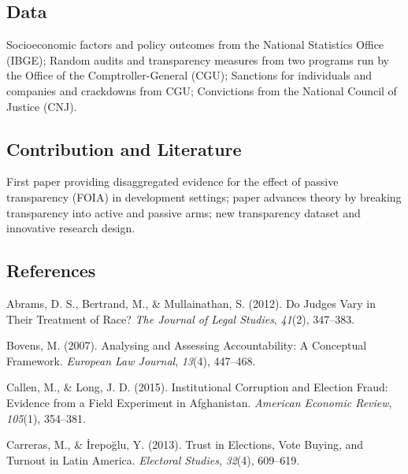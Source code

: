\documentclass[]{article}
\begin{document}
\hypertarget{data-2}{%
\subsection{Data}\label{data-2}}

Socioeconomic factors and policy outcomes from the National Statistics
Office (IBGE); Random audits and transparency measures from two programs
run by the Office of the Comptroller-General (CGU); Sanctions for
individuals and companies and crackdowns from CGU; Convictions from the
National Council of Justice (CNJ).

\hypertarget{contribution-and-literature}{%
\subsection{Contribution and
Literature}\label{contribution-and-literature}}

First paper providing disaggregated evidence for the effect of passive
transparency (FOIA) in development settings; paper advances theory by
breaking transparency into active and passive arms; new transparency
dataset and innovative research design.

\hypertarget{references}{%
\subsection*{References}\label{references}}

\hypertarget{refs}{}
\leavevmode\hypertarget{ref-AbramsJudgesVaryTheir2012}{}%
Abrams, D. S., Bertrand, M., \& Mullainathan, S. (2012). Do Judges Vary
in Their Treatment of Race? \emph{The Journal of Legal Studies},
\emph{41}(2), 347--383.

\leavevmode\hypertarget{ref-BovensAnalysingAssessingAccountability2007}{}%
Bovens, M. (2007). Analysing and Assessing Accountability: A Conceptual
Framework. \emph{European Law Journal}, \emph{13}(4), 447--468.

\leavevmode\hypertarget{ref-CallenInstitutionalCorruptionElection2015}{}%
Callen, M., \& Long, J. D. (2015). Institutional Corruption and Election
Fraud: Evidence from a Field Experiment in Afghanistan. \emph{American
Economic Review}, \emph{105}(1), 354--381.

\leavevmode\hypertarget{ref-CarrerasTrustElectionsVote2013}{}%
Carreras, M., \& İrepoğlu, Y. (2013). Trust in Elections, Vote Buying,
and Turnout in Latin America. \emph{Electoral Studies}, \emph{32}(4),
609--619.
\end{document}
